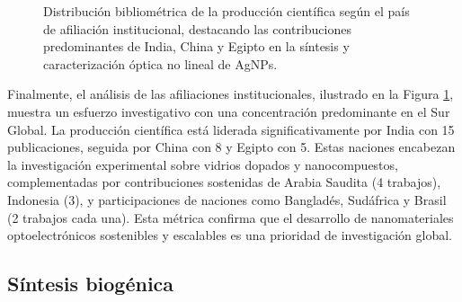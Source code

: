 \begin{figure}[htbp!]
	\centering
	\caption{Distribución bibliométrica de la producción científica según el
		país de afiliación institucional, destacando las contribuciones
		predominantes de India, China y Egipto en la síntesis y caracterización
	óptica no lineal de AgNPs.}
	\label{fig:country_distribution}
\end{figure}

Finalmente, el análisis de las afiliaciones institucionales, ilustrado en la
Figura \ref{fig:country_distribution}, muestra un esfuerzo investigativo con
una concentración predominante en el Sur Global. La producción científica está
liderada significativamente por India con 15 publicaciones, seguida por China
con 8 y Egipto con 5. Estas naciones encabezan la investigación experimental
sobre vidrios dopados y nanocompuestos, complementadas por contribuciones
sostenidas de Arabia Saudita (4 trabajos), Indonesia (3), y participaciones
de naciones como Bangladés, Sudáfrica y Brasil (2 trabajos cada una).
Esta métrica confirma que el desarrollo de nanomateriales optoelectrónicos
sostenibles y escalables es una prioridad de investigación global.

\subsection{Síntesis biogénica}

